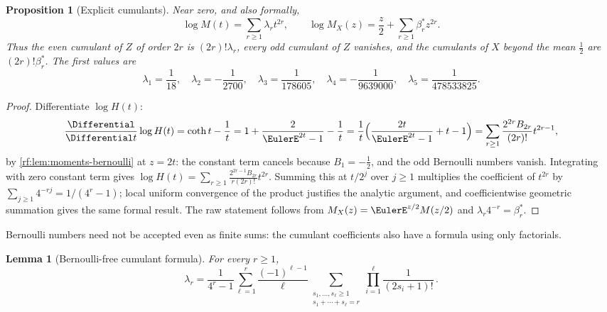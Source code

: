 \documentclass[11pt,oneside]{article}
\theoremstyle{plain}
\newtheorem{proposition}[theorem]{Proposition}
\newtheorem{lemma}[theorem]{Lemma}
\theoremstyle{definition}
\theoremstyle{remark}
\newcommand{\dd}{\Differential}
\begin{document}
\begin{proposition}[Explicit cumulants]
\label{rf:prop:moments-logM}
Near zero, and also formally,
\begin{equation}
 \log M(t)=\sum_{r\ge1}\lambda_{r}t^{2r},\qquad
 \log M_{X}(z)=\frac{z}{2}+\sum_{r\ge1}\beta^{\ast}_{r}z^{2r}.
 \label{rf:eq:moments-logM}
\end{equation}
Thus the even cumulant of $Z$ of order $2r$ is $(2r)!\lambda_{r}$, every odd
cumulant of $Z$ vanishes, and the cumulants of $X$ beyond the mean $\tfrac12$
are $(2r)!\beta^{\ast}_{r}$.  The first values are
\begin{equation}
 \lambda_{1}=\frac{1}{18},\quad\lambda_{2}=-\frac{1}{2700},\quad
 \lambda_{3}=\frac{1}{178605},\quad\lambda_{4}=-\frac{1}{9639000},\quad
 \lambda_{5}=\frac{1}{478533825}.
 \label{rf:eq:moments-lambda-values}
\end{equation}
\end{proposition}

\begin{proof}
Differentiate $\log H(t)$:
\[
 \frac{\dd}{\dd t}\log H(t)=\coth t-\frac1t
 =1+\frac{2}{\EulerE^{2t}-1}-\frac1t
 =\frac1t\Bigl(\frac{2t}{\EulerE^{2t}-1}+t-1\Bigr)
 =\sum_{r\ge1}\frac{2^{2r}B_{2r}}{(2r)!}t^{2r-1},
\]
by \cref{rf:lem:moments-bernoulli} at $z=2t$: the constant term cancels
because $B_{1}=-\tfrac12$, and the odd Bernoulli numbers vanish.
Integrating with zero constant term gives
$\log H(t)=\sum_{r\ge1}\frac{2^{2r-1}B_{2r}}{r(2r)!}t^{2r}$.  Summing this
at $t/2^{j}$ over $j\ge1$ multiplies the coefficient of $t^{2r}$ by
$\sum_{j\ge1}4^{-rj}=1/(4^{r}-1)$; local uniform convergence of the product
justifies the analytic argument, and coefficientwise geometric summation
gives the same formal result.  The raw statement follows from
$M_{X}(z)=\EulerE^{z/2}M(z/2)$ and $\lambda_{r}4^{-r}=\beta^{\ast}_{r}$.
\end{proof}

Bernoulli numbers need not be accepted even as finite sums: the cumulant
coefficients also have a formula using only factorials.

\begin{lemma}[Bernoulli-free cumulant formula]
\label{rf:lem:moments-lambda-nob}
For every $r\ge1$,
\begin{equation}
 \boxed{\;
 \lambda_{r}=\frac{1}{4^{r}-1}\sum_{\ell=1}^{r}\frac{(-1)^{\ell-1}}{\ell}
 \sum_{\substack{s_{1},\ldots,s_{\ell}\ge1\\ s_{1}+\cdots+s_{\ell}=r}}
 \prod_{i=1}^{\ell}\frac{1}{(2s_{i}+1)!}\,.\;}
 \label{rf:eq:moments-lambda-nob}
\end{equation}
\end{lemma}
\end{document}
